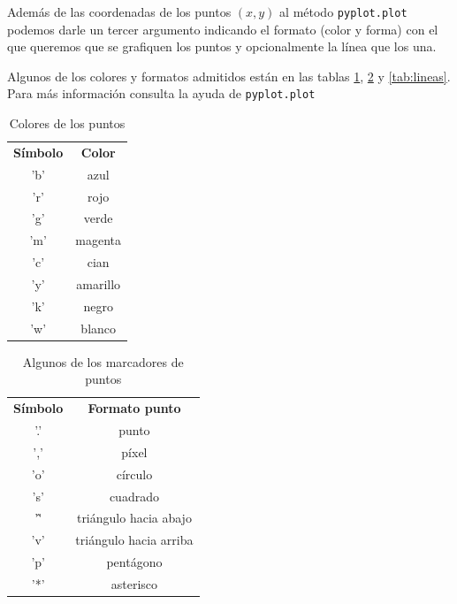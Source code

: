 \begin{paracol}{2}
    Además de las coordenadas de los puntos $(x,y)$ al método \texttt{pyplot.plot} podemos darle un tercer argumento indicando el formato (color y forma) con el que queremos que se grafiquen los puntos y opcionalmente la línea que los una. 

    Algunos de los colores y formatos admitidos están en las tablas \ref{tab:colores}, \ref{tab:puntos} y \ref{tab:lineas}. Para más información consulta la ayuda de \texttt{pyplot.plot}

    
    \begin{table}
        \centering
        \begin{tabular}{|c|c|} \hline
        \textbf{Símbolo}     &  \textbf{Color}\\
             'b'& azul \\ \hline
             'r'& rojo \\ \hline
             'g'& verde \\ \hline
             'm'& magenta\\ \hline
             'c'& cian\\ \hline
             'y'& amarillo\\ \hline
             'k'& negro\\ \hline
             'w'& blanco\\ \hline
        \end{tabular}
        \caption{Colores de los puntos}
        \label{tab:colores}
    \end{table}

    
    \begin{table}
        \centering
        \begin{tabular}{|c|c|} \hline
        \textbf{Símbolo}     &  \textbf{Formato punto}\\
             '.'& punto \\ \hline
             ','& píxel\\ \hline
             'o'& círculo \\ \hline
             's'& cuadrado\\ \hline
             '\^'& triángulo hacia abajo\\ \hline
             'v'& triángulo hacia arriba\\ \hline
             'p'& pentágono\\ \hline
             '*'& asterisco\\ \hline
        \end{tabular}
        \caption{Algunos de los marcadores de puntos}
        \label{tab:puntos}
    \end{table}


\end{paracol}
